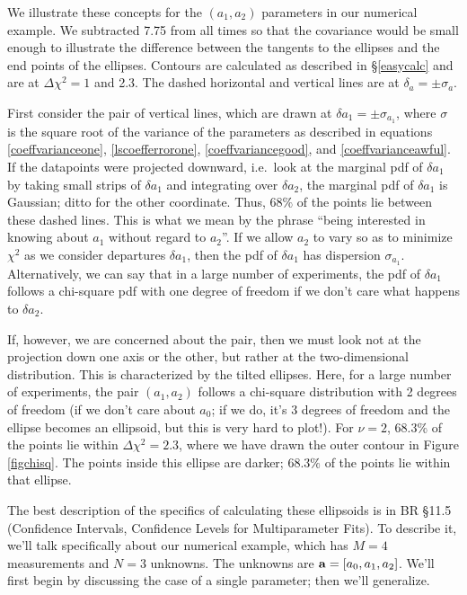 \documentclass[psfig,preprint]{aastex}
\begin{document}
	We illustrate these concepts for the $(a_1,a_2)$ parameters in
our numerical example. We subtracted 7.75 from all times so that the
covariance would be small enough to illustrate the difference between
the tangents to the ellipses and the end points of the ellipses. 
Contours are calculated as described in \S \ref{easycalc} and are at
$\Delta \chi^2 = 1$ and 2.3. The dashed horizontal and vertical lines
are at $\delta_a = \pm \sigma_a$.

	First consider the pair of vertical lines, which are drawn at
$\delta a_1 = \pm \sigma_{a_1}$, where $\sigma$ is the square root of
the variance of the parameters as described in equations
\ref{coeffvarianceone}, \ref{lscoefferrorone}, \ref{coeffvariancegood},
and \ref{coeffvarianceawful}.  If the datapoints were projected
downward, i.e.\ look at the marginal pdf  of $\delta a_1$ by taking
small strips of $\delta a_1$ and integrating over $\delta a_2$, the
marginal pdf of $\delta a_1$ is Gaussian; ditto for the other
coordinate. Thus, $68\%$ of the points lie between these dashed lines.
This is what we mean by the phrase ``being interested in knowing about
$a_1$ without regard to $a_2$''. If we allow $a_2$ to vary so as to
minimize $\chi^2$ as we consider departures $\delta a_1$, then the pdf
of $\delta a_1$ has dispersion $\sigma_{a_1}$. Alternatively, we can say
that in a large number of experiments, the pdf of $\delta a_1$ follows a
chi-square pdf with one degree of freedom if we don't care what happens
to $\delta a_2$.

	If, however, we are concerned about the pair, then we must look
not at the projection down one axis or the other, but rather at the
two-dimensional distribution. This is characterized by the tilted
ellipses. Here, for a large number of experiments, the pair $(a_1,a_2)$
follows a chi-square distribution with 2 degrees of freedom (if we don't
care about $a_0$; if we do, it's 3 degrees of freedom and the ellipse
becomes an ellipsoid, but this is very hard to plot!). For $\nu=2$,
$68.3\%$ of the points lie within $\Delta \chi^2=2.3$, where we have
drawn the outer contour in Figure \ref{figchisq}. The points inside this
ellipse are darker; $68.3\%$ of the points lie within that ellipse.

	The best description of the specifics of calculating these
ellipsoids is in BR \S11.5 (Confidence Intervals, Confidence Levels for
Multiparameter Fits). To describe it, we'll talk specifically about our
numerical example, which has $M=4$ measurements and $N=3$ unknowns. The
unknowns are ${\bf a} = [a_0, a_1, a_2]$. We'll first begin by
discussing the case of a single parameter; then we'll generalize.
\end{document}
